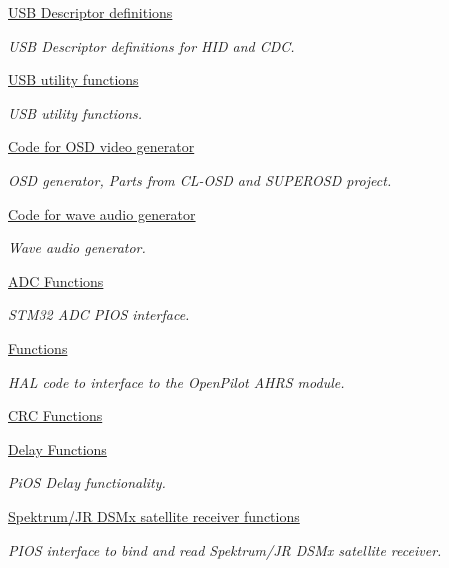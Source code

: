 \begin{DoxyCompactItemize}
\hyperlink{group___p_i_o_s___u_s_b___d_e_s_c}{U\-S\-B Descriptor definitions}
\begin{DoxyCompactList}\small\item\em U\-S\-B Descriptor definitions for H\-I\-D and C\-D\-C. \end{DoxyCompactList}\item 
\hyperlink{group___p_i_o_s___u_s_b___u_t_i_l}{U\-S\-B utility functions}
\begin{DoxyCompactList}\small\item\em U\-S\-B utility functions. \end{DoxyCompactList}\item 
\hyperlink{group___p_i_o_s___v_i_d_e_o}{Code for O\-S\-D video generator}
\begin{DoxyCompactList}\small\item\em O\-S\-D generator, Parts from C\-L-\/\-O\-S\-D and S\-U\-P\-E\-R\-O\-S\-D project. \end{DoxyCompactList}\item 
\hyperlink{group___p_i_o_s___w_a_v_p_l_a_y}{Code for wave audio generator}
\begin{DoxyCompactList}\small\item\em Wave audio generator. \end{DoxyCompactList}\item 
\hyperlink{group___p_i_o_s___a_d_c}{A\-D\-C Functions}
\begin{DoxyCompactList}\small\item\em S\-T\-M32 A\-D\-C P\-I\-O\-S interface. \end{DoxyCompactList}\item 
\hyperlink{group___p_i_o_s___b_o_o_t_l_o_a_d_e_r}{Functions}
\begin{DoxyCompactList}\small\item\em H\-A\-L code to interface to the Open\-Pilot A\-H\-R\-S module. \end{DoxyCompactList}\item 
\hyperlink{group___p_i_o_s___c_r_c}{C\-R\-C Functions}
\item 
\hyperlink{group___p_i_o_s___d_e_l_a_y}{Delay Functions}
\begin{DoxyCompactList}\small\item\em Pi\-O\-S Delay functionality. \end{DoxyCompactList}\item 
\hyperlink{group___p_i_o_s___d_s_m}{Spektrum/\-J\-R D\-S\-Mx satellite receiver functions}
\begin{DoxyCompactList}\small\item\em P\-I\-O\-S interface to bind and read Spektrum/\-J\-R D\-S\-Mx satellite receiver. \end{DoxyCompactList}\item 

\end{DoxyCompactItemize}
